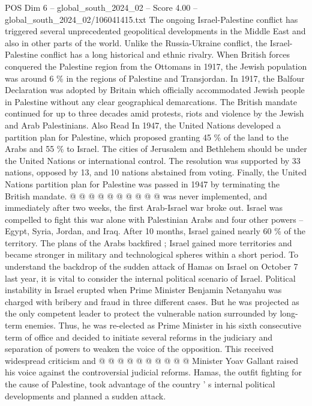 \begin{textsample}{POS Dim 6 – global\_south\_2024\_02 – Score 4.00 – global\_south\_2024\_02/106041415.txt}  \label{ex:f6_pos_165}
The ongoing Israel-Palestine conflict has triggered several unprecedented geopolitical developments in the Middle East and also in other parts of the world.
Unlike the Russia-Ukraine conflict, the Israel-Palestine conflict has a long historical and ethnic rivalry.
When British forces conquered the Palestine region from the Ottomans in 1917, the Jewish population was around 6 \% in the regions of Palestine and Transjordan.
In 1917, the Balfour Declaration was adopted by Britain which officially accommodated Jewish people in Palestine without any clear geographical demarcations.
The British mandate continued for up to three decades amid protests, riots and violence by the Jewish and Arab Palestinians.
Also Read In 1947, the United Nations developed a partition plan for Palestine, which proposed granting 45 \% of the land to the Arabs and 55 \% to Israel.
The cities of Jerusalem and Bethlehem should be under the United Nations or international control.
The resolution was supported by 33 nations, opposed by 13, and 10 nations abstained from voting.
Finally, the United Nations partition plan for Palestine was passed in 1947 by terminating the British mandate. @ @ @ @ @ @ @ @ @ @ was never implemented, and immediately after two weeks, the first Arab-Israel war broke out.
Israel was compelled to fight this war alone with Palestinian Arabs and four other powers -- Egypt, Syria, Jordan, and Iraq.
After 10 months, Israel gained nearly 60 \% of the territory.
The plans of the Arabs backfired ; Israel gained more territories and became stronger in military and technological spheres within a short period.
To understand the backdrop of the sudden attack of Hamas on Israel on October 7 last year, it is vital to consider the internal political scenario of Israel.
Political instability in Israel erupted when Prime Minister Benjamin Netanyahu was charged with bribery and fraud in three different cases.
But he was projected as the only competent leader to protect the vulnerable nation surrounded by long-term enemies.
Thus, he was re-elected as Prime Minister in his sixth consecutive term of office and decided to initiate several reforms in the judiciary and separation of powers to weaken the voice of the opposition.
This received widespread criticism and @ @ @ @ @ @ @ @ @ @ Minister Yoav Gallant raised his voice against the controversial judicial reforms.
Hamas, the outfit fighting for the cause of Palestine, took advantage of the country ' s internal political developments and planned a sudden attack.

\end{textsample}
